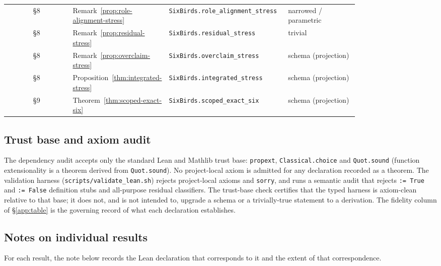 {\begin{longtable}{@{}c >{\raggedright\arraybackslash}p{0.27\linewidth} >{\raggedright\arraybackslash}p{0.34\linewidth} >{\raggedright\arraybackslash}p{0.20\linewidth}@{}}
§8 & Remark~\ref{prop:role-alignment-stress} & \texttt{SixBirds.\allowbreak role\_\allowbreak alignment\_\allowbreak stress} & narrowed / parametric \\
§8 & Remark~\ref{prop:residual-stress} & \texttt{SixBirds.\allowbreak residual\_\allowbreak stress} & trivial \\
§8 & Remark~\ref{prop:overclaim-stress} & \texttt{SixBirds.\allowbreak overclaim\_\allowbreak stress} & schema (projection) \\
§8 & Proposition~\ref{thm:integrated-stress} & \texttt{SixBirds.\allowbreak integrated\_\allowbreak stress} & schema (projection) \\
§9 & Theorem~\ref{thm:scoped-exact-six} & \texttt{SixBirds.\allowbreak scoped\_\allowbreak exact\_\allowbreak six} & schema (projection) \\
\bottomrule
\end{longtable}
}

\subsection{Trust base and axiom audit}\label{app:trust-base}

The dependency audit accepts only the standard Lean and Mathlib trust base:
\texttt{propext}, \texttt{Classical.choice} and \texttt{Quot.sound}
(function extensionality is a theorem derived from \texttt{Quot.sound}). No project-local axiom is
admitted for any declaration recorded as a theorem. The validation harness
(\texttt{scripts/validate\_lean.sh}) rejects project-local axioms and
\texttt{sorry}, and runs a semantic audit that rejects \texttt{:= True} and
\texttt{:= False} definition stubs and all-purpose residual classifiers. The
trust-base check certifies that the typed harness is axiom-clean relative to that
base; it does not, and is not intended to, upgrade a schema or a trivially-true
statement to a derivation. The fidelity column of \S\ref{app:table} is the
governing record of what each declaration establishes.

\subsection{Notes on individual results}\label{app:result-notes}

For each result, the note below records the Lean declaration that corresponds to it and the extent of that correspondence.

